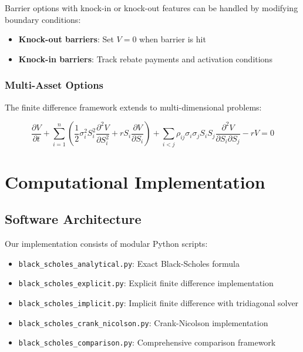 \documentclass[12pt,a4paper]{article}
\numberwithin{algorithm}{subsection}
\begin{document}
Barrier options with knock-in or knock-out features can be handled by modifying boundary conditions:

\begin{itemize}
\item \textbf{Knock-out barriers}: Set $V = 0$ when barrier is hit
\item \textbf{Knock-in barriers}: Track rebate payments and activation conditions
\end{itemize}

\subsubsection{Multi-Asset Options}

The finite difference framework extends to multi-dimensional problems:

\begin{equation}
\frac{\partial V}{\partial t} + \sum_{i=1}^n \left( \frac{1}{2}\sigma_i^2 S_i^2 \frac{\partial^2 V}{\partial S_i^2} + r S_i \frac{\partial V}{\partial S_i} \right) + \sum_{i<j} \rho_{ij}\sigma_i\sigma_j S_i S_j \frac{\partial^2 V}{\partial S_i \partial S_j} - rV = 0
\end{equation}

\section{Computational Implementation}

\subsection{Software Architecture}

Our implementation consists of modular Python scripts:

\begin{itemize}
\item \texttt{black\_scholes\_analytical.py}: Exact Black-Scholes formula
\item \texttt{black\_scholes\_explicit.py}: Explicit finite difference implementation
\item \texttt{black\_scholes\_implicit.py}: Implicit finite difference with tridiagonal solver
\item \texttt{black\_scholes\_crank\_nicolson.py}: Crank-Nicolson implementation
\item \texttt{black\_scholes\_comparison.py}: Comprehensive comparison framework
\end{itemize}
\end{document}
